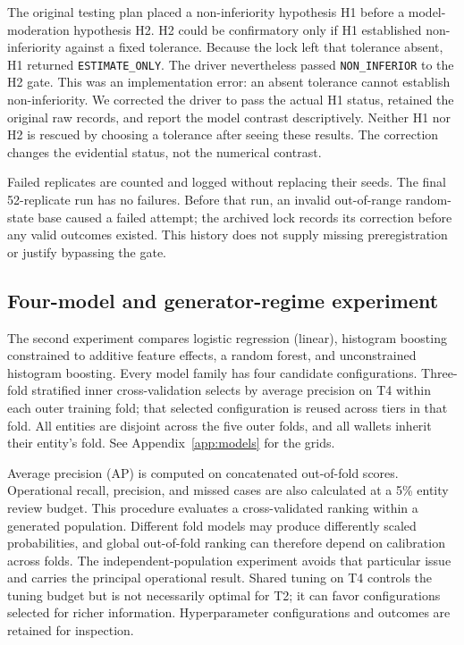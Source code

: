 \documentclass[11pt,a4paper]{article}
\begin{document}
The original testing plan placed a non-inferiority hypothesis H1 before a model-moderation hypothesis H2. H2 could be confirmatory only if H1 established non-inferiority against a fixed tolerance. Because the lock left that tolerance absent, H1 returned \texttt{ESTIMATE\_ONLY}. The driver nevertheless passed \texttt{NON\_INFERIOR} to the H2 gate. This was an implementation error: an absent tolerance cannot establish non-inferiority. We corrected the driver to pass the actual H1 status, retained the original raw records, and report the model contrast descriptively. Neither H1 nor H2 is rescued by choosing a tolerance after seeing these results. The correction changes the evidential status, not the numerical contrast.

Failed replicates are counted and logged without replacing their seeds. The final 52-replicate run has no failures. Before that run, an invalid out-of-range random-state base caused a failed attempt; the archived lock records its correction before any valid outcomes existed. This history does not supply missing preregistration or justify bypassing the gate.

\subsection{Four-model and generator-regime experiment}
The second experiment compares logistic regression (linear), histogram boosting constrained to additive feature effects, a random forest, and unconstrained histogram boosting. Every model family has four candidate configurations. Three-fold stratified inner cross-validation selects by average precision on T4 within each outer training fold; that selected configuration is reused across tiers in that fold. All entities are disjoint across the five outer folds, and all wallets inherit their entity's fold. See Appendix~\ref{app:models} for the grids.

Average precision (AP) is computed on concatenated out-of-fold scores. Operational recall, precision, and missed cases are also calculated at a 5\% entity review budget. This procedure evaluates a cross-validated ranking within a generated population. Different fold models may produce differently scaled probabilities, and global out-of-fold ranking can therefore depend on calibration across folds. The independent-population experiment avoids that particular issue and carries the principal operational result. Shared tuning on T4 controls the tuning budget but is not necessarily optimal for T2; it can favor configurations selected for richer information. Hyperparameter configurations and outcomes are retained for inspection.
\end{document}
